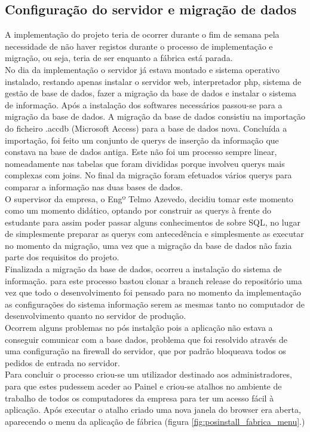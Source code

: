 \subsection{Configuração do servidor e migração de dados}
A implementação do projeto teria de ocorrer durante o fim de semana pela necessidade de não haver registos durante o processo de implementação e migração, ou seja, teria de ser enquanto a fábrica está parada.\\
No dia da implementação o servidor já estava montado e sistema operativo instalado, restando apenas instalar o servidor web, interpretador php, sistema de gestão de base de dados, fazer a migração da base de dados e instalar o sistema de informação. Após a instalação dos softwares necessários passou-se para a migração da base de dados. A migração da base de dados consistiu na importação do ficheiro .accdb (Microsoft Access) para a base de dados nova. Concluída a importação, foi feito um conjunto de querys de inserção da informação que constava na base de dados antiga. Este não foi um processo sempre linear, nomeadamente nas tabelas que foram divididas porque involveu querys mais complexas com joins.
No final da migração foram efetuados vários querys para comparar a informação nas duas bases de dados.\\
O supervisor da empresa, o Engº Telmo Azevedo, decidiu tomar este momento como um momento didático, optando por construir as querys à frente do estudante para assim poder passar alguns conhecimentos de sobre SQL, no lugar de simplesmente preparar as querys com antecedência e simplesmente as executar no momento da migração, uma vez que a migração da base de dados não fazia parte dos requisitos do projeto.\\
Finalizada a migração da base de dados, ocorreu a instalação do sistema de informação. para este processo bastou clonar a branch release do repositório uma vez que todo o desenvolvimento foi pensado para no momento da implementação as configurações do sistema informação serem as mesmas tanto no computador de desenvolvimento quanto no servidor de produção.\\
Ocorrem alguns problemas no pós instalção pois a aplicação não estava a conseguir comunicar com a base dados, problema que foi resolvido através de uma configuração na firewall do servidor, que por padrão bloqueava todos os pedidos de entrada no servidor.\\
Para concluir o processo criou-se um utilizador destinado aos administradores, para que estes pudessem aceder ao Painel e criou-se atalhos no ambiente de trabalho de todos os computadores da empresa para ter um acesso fácil à aplicação. Após executar o atalho criado uma nova janela do browser era aberta, aparecendo o menu da aplicação de fábrica (figura \ref{fig:posinstall_fabrica_menu}.) 
